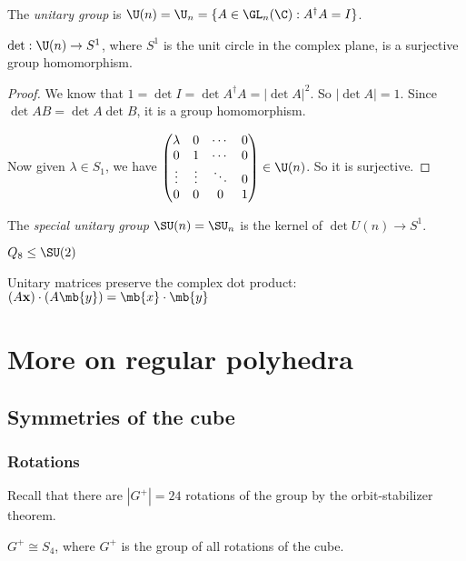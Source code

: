 \documentclass[a4paper]{article}
\begin{document}
  \begin{defi}
    The \emph{unitary group} is $\U(n) = \U_n = \{A\in \GL_n(\C): A^\dagger A = I\}$.
  \end{defi}

  \begin{lemma}
    $\det: \U(n)\to S^1$, where $S^1$ is the unit circle in the complex plane, is a surjective group homomorphism.
  \end{lemma}

  \begin{proof}
    We know that $1 = \det I = \det A^\dagger A = |\det A|^2$. So $|\det A| = 1$. Since $\det AB = \det A\det B$, it is a group homomorphism.

    Now given $\lambda\in S_1$, we have 
    $\begin{pmatrix}
      \lambda & 0 & \cdots & 0\\
      0 & 1 & \cdots & 0\\
      \vdots & \vdots & \ddots & 0\\
      0 & 0 & 0 & 1
    \end{pmatrix}\in \U(n)$. So it is surjective.
  \end{proof}

  \begin{defi}
    The \emph{special unitary group} $\SU(n) = \SU_n$ is the kernel of $\det U(n)\to S^1$.
  \end{defi}
  \note $Q_8 \leq \SU(2)$

  Unitary matrices preserve the complex dot product: $(A\mathbf{x})\cdot (A\mb{y}) = \mb{x}\cdot \mb{y}$

  \section{More on regular polyhedra}
  \subsection{Symmetries of the cube}
  \subsubsection{Rotations}
  Recall that there are $|G^+| = 24$ rotations of the group by the orbit-stabilizer theorem.
  \begin{prop}
    $G^+ \cong S_4$, where $G^+$ is the group of all rotations of the cube.
  \end{prop}
\end{document}
